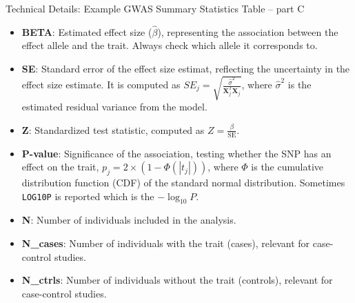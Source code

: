 \begin{frame}{Technical Details: Example GWAS Summary Statistics Table -- part C}

\begin{table}[h]
\centering
{}
\end{table}

\begin{itemize}
\item \textbf{BETA}: Estimated effect size ($\hat{\beta}$), representing the association between the effect allele and the trait. Always check which allele it corresponds to.  
\item \textbf{SE}: Standard error of the effect size estimat, reflecting the uncertainty in the effect size estimate. It is computed as $SE_j = \sqrt{\frac{\hat{\sigma}^2}{\mathbf{X}_j^T \mathbf{X}_j}}$, where $ \hat{\sigma}^2 $ is the estimated residual variance from the model.
\item \textbf{Z}: Standardized test statistic, computed as $Z = \frac{\beta}{\text{SE}}$.  
\item \textbf{P-value}: Significance of the association, testing whether the SNP has an effect on the trait, $p_j = 2 \times (1 - \Phi(|t_j|))$, where $ \Phi $ is the cumulative distribution function (CDF) of the standard normal distribution. Sometimes \texttt{LOG10P} is reported which is the $-\log_{10}P$.
\item \textbf{N}: Number of individuals included in the analysis.  
\item \textbf{N_cases}: Number of individuals with the trait (cases), relevant for case-control studies.  
\item \textbf{N_ctrls}: Number of individuals without the trait (controls), relevant for case-control studies.  
\end{itemize}

\end{frame}

